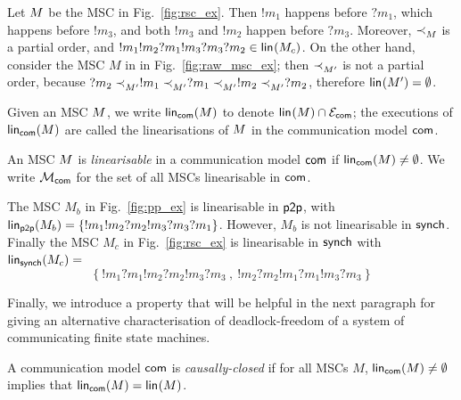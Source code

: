 \begin{example}
	\label{ex:linearisation}
	Let $M$ be the MSC in Fig.~\ref{fig:rsc_ex}. 
	Then $!m_1$ happens before $?m_1$, which
	happens before $!m_3$, and both $!m_3$ and $!m_2$
	happen before $?m_3$.
	Moreover, $\mathrel{\prec_{M}^{}}$ is a partial order, 
	and 
	$!m_1!m_2?m_1!m_3?m_3?m_2 \in \mathsf{lin}_{}(M_c)$.
	On the other hand, consider the MSC $M$ in 
	in Fig.~\ref{fig:raw_msc_ex}; then
	$\mathrel{\prec_{M'}^{}}$ is not a partial order, because
	$?m_2\mathrel{\prec_{M'}^{}}!m_1\mathrel{\prec_{M'}^{}}?m_1\mathrel{\prec_{M'}^{}}!m_2\mathrel{\prec_{M'}^{}}?m_2$,
	therefore $\mathsf{lin}_{}(M')=\emptyset$.
\end{example}


Given an MSC $M$, we write 
$\mathsf{lin}_{\mathsf{com}}(M)$
to denote 
$\mathsf{lin}_{}(M)\cap\mathcal{E}_{\mathsf{com}}$; 
the executions of $\mathsf{lin}_{\mathsf{com}}(M)$
are called the linearisations of $M$ 
in the communication model $\mathsf{com}$. 	

\begin{definition}
	\label{def:linearisable-msc}
	An MSC $M$ is \emph{linearisable} in a communication model $\mathsf{com}$ if 
	$\mathsf{lin}_{\mathsf{com}}(M)\neq\emptyset$.
	We write $\mathcal{M}_{\mathsf{com}}$ for the set of all MSCs linearisable in $\mathsf{com}$.
\end{definition}

\begin{example}
	\label{ex:msc-linearisable}
	The MSC $M_b$ in Fig.~\ref{fig:pp_ex} is linearisable in $\mathsf{p2p}$,
	with $\mathsf{lin}_{\mathsf{p2p}}(M_b)=
		\{!m_1!m_2?m_2!m_3?m_3?m_1\}
		$.
	However, $M_b$ is not linearisable in $\mathsf{synch}$.
	Finally the MSC $M_c$ in Fig.~\ref{fig:rsc_ex} is linearisable in $\mathsf{synch}$ with
	$\mathsf{lin}_{\mathsf{synch}}(M_c)=$
	$$
	\{~!m_1?m_1!m_2?m_2!m_3?m_3~,~
	   !m_2?m_2!m_1?m_1!m_3?m_3~\}
	$$
\end{example}

Finally, we introduce a property that will be helpful in the next paragraph 
for
giving an alternative characterisation of deadlock-freedom of a system of communicating finite state machines.

\begin{definition}\label{def:causally-closed-communication-model}
	A communication model $\mathsf{com}$ is \emph{causally-closed} if for all MSCs $M$,
	$\mathsf{lin}_{\mathsf{com}}(M)\neq\emptyset$ implies that
	$\mathsf{lin}_{\mathsf{com}}(M)=\mathsf{lin}_{}(M)$.
\end{definition}


